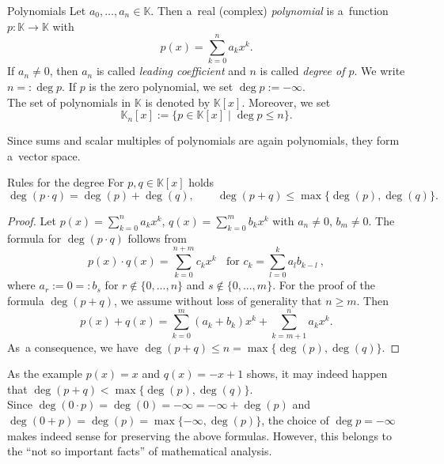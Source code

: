 

\begin{Definition}{Polynomials}
Let $a_0,\ldots,a_n\in\mathbb{K}$. Then a~real (complex) \emph{polynomial} is a~function $p:\mathbb{K}\to\mathbb{K}$ with
\[p(x)=\sum_{k=0}^na_kx^k.\]
If $a_n\neq0$, then $a_n$ is called \emph{leading coefficient} and $n$ is called \emph{degree of $p$}. 
We write $n=:\deg p$. If $p$ is the zero polynomial, we set $\deg p:=-\infty$.\\
The set of polynomials in $\mathbb{K}$ is denoted by $\mathbb{K}[x]$. Moreover, we set
\[\mathbb{K}_n[x]:=\{p\in\mathbb{K}[x]\;|\;\deg p\leq n\}.\]
\end{Definition}
\begin{Remark}{}
Since sums and scalar multiples of polynomials are again polynomials, they form a~vector space.
\end{Remark}
\begin{Theorem}{Rules for the degree}
For $p,q\in\mathbb{K}[x]$ holds
\[\deg(p\cdot q)=\deg(p)+\deg(q),\qquad \deg(p+q)\leq\max\{\deg(p),\deg(q)\}.\]
\end{Theorem}
\begin{proof}
Let $p(x)=\sum_{k=0}^na_kx^k$, $q(x)=\sum_{k=0}^mb_kx^k$ with $a_n\neq0$, $b_m\neq0$. The formula for $\deg(p\cdot q)$ follows from
\[p(x)\cdot q(x)=\sum_{k=0}^{n+m}c_kx^k\;\;\text{ for }c_k=\sum_{l=0}^ka_lb_{k-l} \ ,\]
where $a_r:=0=:b_s$ for $r\not\in\{0,...,n\}$ and $s\not\in\{0,...,m\}$.  
For the proof of the formula $\deg(p+q)$, we assume without loss of generality that $n\geq m$. Then
\[p(x)+q(x)=\sum_{k=0}^{m}(a_k+b_k)x^k+\sum_{k=m+1}^{n}a_kx^k.\]
As~a consequence, we have $\deg(p+q)\leq n=\max\{\deg(p),\deg(q)\}$.
\end{proof}
\begin{Remark}{}
As the example $p(x)=x$ and $q(x)=-x+1$ shows, it may indeed happen that $\deg(p+q)<\max\{\deg(p),\deg(q)\}$.\\
Since $\deg(0\cdot p)=\deg(0)=-\infty=-\infty+\deg(p)$ and $\deg(0+p)=\deg(p)=\max\{-\infty,\deg(p)\}$, the choice of $\deg p=-\infty$ 
makes indeed sense for preserving the above formulas. However, this belongs to the ``not so important facts'' of mathematical analysis.
\end{Remark}

